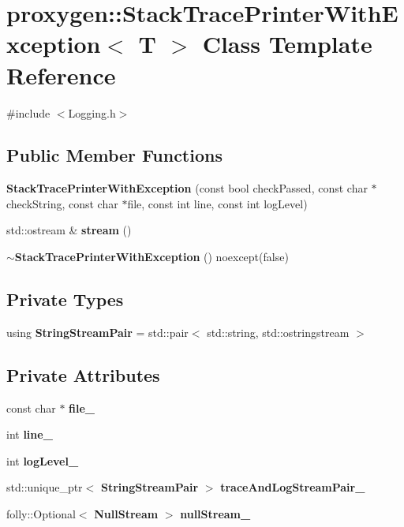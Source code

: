 \section{proxygen\+:\+:Stack\+Trace\+Printer\+With\+Exception$<$ T $>$ Class Template Reference}
\label{classproxygen_1_1StackTracePrinterWithException}


{\ttfamily \#include $<$Logging.\+h$>$}

\subsection*{Public Member Functions}
\begin{DoxyCompactItemize}
\item 
{\bf Stack\+Trace\+Printer\+With\+Exception} (const bool check\+Passed, const char $\ast$check\+String, const char $\ast$file, const int line, const int log\+Level)
\item 
std\+::ostream \& {\bf stream} ()
\item 
{\bf $\sim$\+Stack\+Trace\+Printer\+With\+Exception} () noexcept(false)
\end{DoxyCompactItemize}
\subsection*{Private Types}
\begin{DoxyCompactItemize}
\item 
using {\bf String\+Stream\+Pair} = std\+::pair$<$ std\+::string, std\+::ostringstream $>$
\end{DoxyCompactItemize}
\subsection*{Private Attributes}
\begin{DoxyCompactItemize}
\item 
const char $\ast$ {\bf file\+\_\+}
\item 
int {\bf line\+\_\+}
\item 
int {\bf log\+Level\+\_\+}
\item 
std\+::unique\+\_\+ptr$<$ {\bf String\+Stream\+Pair} $>$ {\bf trace\+And\+Log\+Stream\+Pair\+\_\+}
\item 
folly\+::\+Optional$<$ {\bf Null\+Stream} $>$ {\bf null\+Stream\+\_\+}
\end{DoxyCompactItemize}



